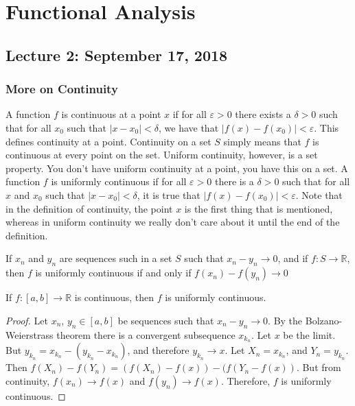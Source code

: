 \documentclass[crop=false,class=article,oneside]{standalone}
\begin{document}
    \ifx\iffunct\undefined
        \section*{Functional Analysis}
        \setcounter{section}{1}
        \setcounter{subsection}{1}
    \fi
\subsection{Lecture 2: September 17, 2018}
    \subsubsection{More on Continuity}
        A function $f$ is continuous at a point $x$ if
        for all $\varepsilon>0$ there exists a $\delta>0$
        such that for all $x_{0}$ such that
        $|x-x_{0}|<\delta$, we have that
        $|f(x)-f(x_{0})|<\varepsilon$. This defines
        continuity at a point. Continuity on a set
        $S$ simply means that $f$ is continuous
        at every point on the set. Uniform continuity,
        however, is a set property. You don't have
        uniform continuity at a point, you have this
        on a set. A function $f$ is uniformly continuous
        if for all $\varepsilon>0$ there is a $\delta>0$
        such that for all $x$ and $x_{0}$ such that
        $|x-x_{0}|<\delta$, it is true that
        $|f(x)-f(x_{0})|<\varepsilon$. Note that in
        the definition of continuity, the point $x$
        is the first thing that is mentioned, whereas in
        uniform continuity we really don't care about it
        until the end of the definition.
        \begin{theorem}
            If $x_{n}$ and $y_{n}$ are sequences such
            in a set $S$ such that $x_{n}-y_{n}\rightarrow{0}$,
            and if $f:{S}\rightarrow\mathbb{R}$, then
            $f$ is uniformly continuous if and only if
            $f(x_{n})-f(y_{n})\rightarrow{0}$
        \end{theorem}
        \begin{theorem}
            If $f:[a,b]\rightarrow\mathbb{R}$ is continuous,
            then $f$ is uniformly continuous.
        \end{theorem}
        \begin{proof}
            Let $x_{n}$, $y_{n}\in[a,b]$ be sequences such
            that $x_{n}-y_{n}\rightarrow{0}$. By the
            Bolzano-Weierstrass theorem there is a
            convergent subsequence $x_{k_{n}}$. Let $x$
            be the limit. But
            $y_{k_{n}}=x_{k_{n}}-(y_{k_{n}}-x_{k_{n}})$,
            and therefore $y_{k_{n}}\rightarrow{x}$.
            Let $X_{n}=x_{k_{n}}$, and $Y_{n}=y_{k_{n}}$.
            Then
            $f(X_{n})-f(Y_{n})%
             =(f(X_{n})-f(x))-(f(Y_{n}-f(x))$.
            But from continuity, $f(x_{n})\rightarrow{f(x)}$
            and $f(y_{n})\rightarrow{f(x)}$. Therefore, $f$
            is uniformly continuous.
        \end{proof}
\end{document}
